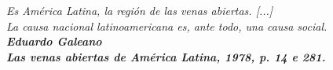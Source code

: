 \pretextualchapter{}
\vfill
\begin{flushright}
	\textit{Es América Latina, la región de las venas abiertas. [...] \\
        La causa nacional latinoamericana es, ante todo, una causa social.}\\
	\textbf{\textit{Eduardo Galeano \\ Las venas abiertas de América Latina, 1978, p. 14 e 281.}}
\end{flushright}








